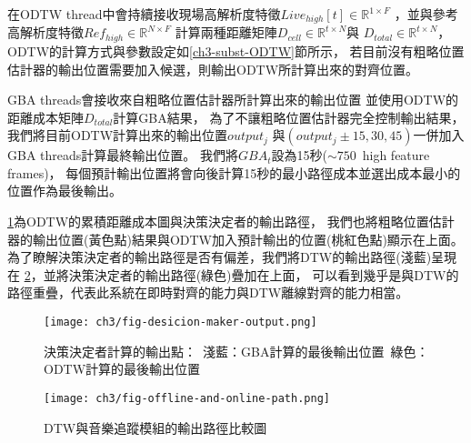 \documentclass[class=NCU_thesis, crop=false]{standalone}
\begin{document}
在ODTW thread中會持續接收現場高解析度特徵$Live_{high}[t] \in \mathbb{R}^{1 \times F}$
，並與參考高解析度特徵$Ref_{high} \in \mathbb{R}^{N \times F}$
計算兩種距離矩陣$D_{cell} \in \mathbb{R}^{t \times N}$與
$D_{total} \in \mathbb{R}^{t \times N}$，
ODTW的計算方式與參數設定如\ref{ch3-subst-ODTW}節所示，
若目前沒有粗略位置估計器的輸出位置需要加入候選，則輸出ODTW所計算出來的對齊位置。

GBA threads會接收來自粗略位置估計器所計算出來的輸出位置
並使用ODTW的距離成本矩陣$D_{total}$計算GBA結果，
為了不讓粗略位置估計器完全控制輸出結果，
我們將目前ODTW計算出來的輸出位置$output_j$
與$(output_j\pm 15, 30, 45)$一併加入GBA threads計算最終輸出位置。
我們將$GBA_{t}$設為15秒($\sim 750$\ high feature frames)，
每個預計輸出位置將會向後計算15秒的最小路徑成本並選出成本最小的位置作為最後輸出。

\cref{fig:fig-ch3-desicion-maker-output}為ODTW的累積距離成本圖與決策決定者的輸出路徑，
我們也將粗略位置估計器的輸出位置(黃色點)結果與ODTW加入預計輸出的位置(桃紅色點)顯示在上面。
為了瞭解決策決定者的輸出路徑是否有偏差，我們將DTW的輸出路徑(淺藍)呈現在
\cref{fig:fig-ch3-offline-and-online-path}，並將決策決定者的輸出路徑(綠色)疊加在上面，
可以看到幾乎是與DTW的路徑重疊，代表此系統在即時對齊的能力與DTW離線對齊的能力相當。
\begin{figure}[H]
    \centering
    \texttt{[image: ch3/fig-desicion-maker-output.png]}
    \caption{決策決定者計算的輸出點：\ 淺藍：GBA計算的最後輸出位置\ 綠色：ODTW計算的最後輸出位置}
    \label{fig:fig-ch3-desicion-maker-output}
\end{figure}
\begin{figure}[H]
    \centering
    \texttt{[image: ch3/fig-offline-and-online-path.png]}
    \caption{DTW與音樂追蹤模組的輸出路徑比較圖}
    \label{fig:fig-ch3-offline-and-online-path}
\end{figure}


\pagebreak
\end{document}

